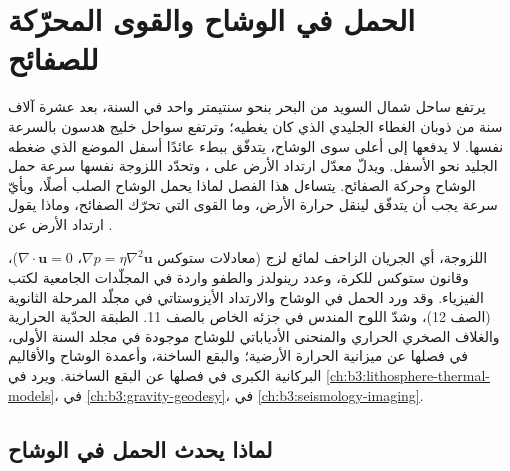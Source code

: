\chapter{الحمل في الوشاح والقوى المحرّكة للصفائح}\label{ch:b3:mantle-convection}

يرتفع ساحل شمال السويد من البحر بنحو سنتيمتر واحد في
السنة، بعد عشرة آلاف سنة من ذوبان الغطاء الجليدي الذي كان يغطيه؛
وترتفع سواحل خليج هدسون بالسرعة نفسها. لا يدفعها إلى أعلى سوى الوشاح،
يتدفّق ببطء عائدًا أسفل الموضع الذي ضغطه الجليد نحو الأسفل. ويدلّ معدّل
ارتداد الأرض على ، وتحدّد اللزوجة نفسها
سرعة حمل الوشاح وحركة الصفائح. يتساءل هذا الفصل
لماذا يحمل الوشاح الصلب أصلًا، وبأيّ سرعة يجب أن يتدفّق لينقل
حرارة الأرض، وما القوى التي تحرّك الصفائح، وماذا يقول ارتداد
الأرض عن .

\begin{recall}
اللزوجة، أي الجريان الزاحف لمائع لزج (معادلات ستوكس
$\nabla p = \eta\nabla^2\mathbf u$، $\nabla\cdot\mathbf u = 0$)، وقانون ستوكس
للكرة، وعدد رينولدز والطفو واردة في
المجلّدات الجامعية لكتب الفيزياء. وقد ورد الحمل في الوشاح والارتداد
الأيزوستاتي في مجلّد المرحلة الثانوية (الصف 12)،  وشدّ اللوح المندس في جزئه الخاص بالصف 11.
الطبقة الحدّية الحرارية والغلاف الصخري الحراري والمنحنى الأدياباتي للوشاح
موجودة في مجلد السنة الأولى، في فصلها عن ميزانية الحرارة الأرضية؛ والبقع الساخنة،
وأعمدة الوشاح والأقاليم البركانية الكبرى في فصلها عن البقع الساخنة.
ويرد  في \cref{ch:b3:lithosphere-thermal-models}،
 في \cref{ch:b3:gravity-geodesy}،
 في \cref{ch:b3:seismology-imaging}.
\end{recall}

\section{لماذا يحدث الحمل في الوشاح}

